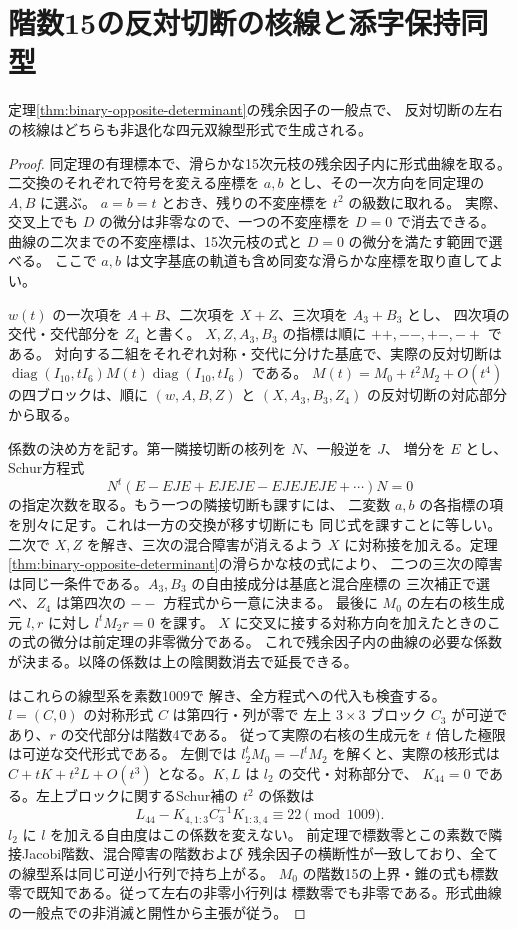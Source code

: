 \section{階数15の反対切断の核線と添字保持同型}
\label{sec:rank-fifteen-opposite-kernels}
\begin{theorem}\label{thm:rank-fifteen-opposite-kernels}
定理\ref{thm:binary-opposite-determinant}の残余因子の一般点で、
反対切断の左右の核線はどちらも非退化な四元双線型形式で生成される。
\end{theorem}
\begin{proof}
同定理の有理標本で、滑らかな15次元枝の残余因子内に形式曲線を取る。
二交換のそれぞれで符号を変える座標を $a,b$ とし、その一次方向を同定理の $A,B$ に選ぶ。
$a=b=t$ とおき、残りの不変座標を $t^2$ の級数に取れる。
実際、交叉上でも $D$ の微分は非零なので、一つの不変座標を $D=0$ で消去できる。
曲線の二次までの不変座標は、15次元枝の式と $D=0$ の微分を満たす範囲で選べる。
ここで $a,b$ は文字基底の軌道も含め同変な滑らかな座標を取り直してよい。

$w(t)$ の一次項を $A+B$、二次項を $X+Z$、三次項を $A_3+B_3$ とし、
四次項の交代・交代部分を $Z_4$ と書く。
$X,Z,A_3,B_3$ の指標は順に $++,--,+-,-+$ である。
対向する二組をそれぞれ対称・交代に分けた基底で、実際の反対切断は
$\operatorname{diag}(I_{10},tI_6)M(t)\operatorname{diag}(I_{10},tI_6)$ である。
$M(t)=M_0+t^2M_2+O(t^4)$ の四ブロックは、順に
$(w,A,B,Z)$ と $(X,A_3,B_3,Z_4)$ の反対切断の対応部分から取る。

係数の決め方を記す。第一隣接切断の核列を $N$、一般逆を $J$、
増分を $E$ とし、Schur方程式
\[
 N^t(E-EJE+EJEJE-EJEJEJE+\cdots)N=0
\]
の指定次数を取る。もう一つの隣接切断も課すには、
二変数 $a,b$ の各指標の項を別々に足す。これは一方の交換が移す切断にも
同じ式を課すことに等しい。二次で $X,Z$ を解き、三次の混合障害が消えるよう
$X$ に対称接を加える。定理\ref{thm:binary-opposite-determinant}の滑らかな枝の式により、
二つの三次の障害は同じ一条件である。$A_3,B_3$ の自由接成分は基底と混合座標の
三次補正で選べ、$Z_4$ は第四次の $--$ 方程式から一意に決まる。
最後に $M_0$ の左右の核生成元 $l,r$ に対し $l^tM_2r=0$ を課す。
$X$ に交叉に接する対称方向を加えたときのこの式の微分は前定理の非零微分である。
これで残余因子内の曲線の必要な係数が決まる。以降の係数は上の陰関数消去で延長できる。

 はこれらの線型系を素数1009で
解き、全方程式への代入も検査する。$l=(C,0)$ の対称形式 $C$ は第四行・列が零で
左上 $3\times3$ ブロック $C_3$ が可逆であり、$r$ の交代部分は階数4である。
従って実際の右核の生成元を $t$ 倍した極限は可逆な交代形式である。
左側では $l_2^t M_0=-l^tM_2$ を解くと、実際の核形式は
$C+tK+t^2L+O(t^3)$ となる。$K,L$ は $l_2$ の交代・対称部分で、
$K_{44}=0$ である。左上ブロックに関するSchur補の $t^2$ の係数は
\[
 L_{44}-K_{4,1:3}C_3^{-1}K_{1:3,4}\equiv 22\pmod {1009}.
\]
$l_2$ に $l$ を加える自由度はこの係数を変えない。
前定理で標数零とこの素数で隣接Jacobi階数、混合障害の階数および
残余因子の横断性が一致しており、全ての線型系は同じ可逆小行列で持ち上がる。
$M_0$ の階数15の上界・錐の式も標数零で既知である。従って左右の非零小行列は
標数零でも非零である。形式曲線の一般点での非消滅と開性から主張が従う。
\end{proof}

